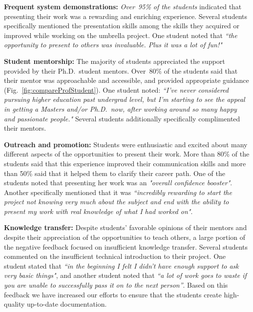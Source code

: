 \documentclass[journal,twopages]{IEEEtran}
\newcommand{\makered}[1]{\color{black}#1\color{black}}
\newenvironment{myitemize}{\begin{list}{}{\renewcommand{\leftmargin}{0.2in}}}{\end{list}}
\begin{document}
\begin{myitemize}
\item  \textbf{Frequent system demonstrations:}
    \emph{Over~95\% of the students} indicated that presenting their work was a rewarding and enriching experience. Several students specifically mentioned the presentation skills among the skills they acquired or improved while working on the umbrella project.
    One student noted that
    \emph{``the opportunity to present to
    others was invaluable. Plus it was a lot of fun!"}

\item  \textbf{Student mentorship:} The majority of students appreciated the
    support provided by their Ph.D.\ student mentors.
    Over~80\% of the students said that their mentor was approachable and accessible, and provided appropriate guidance (Fig.~\ref{fig:compareProfStudent}).
    One student noted: \emph{``I've never considered pursuing higher education past undergrad level, but I'm starting to see the appeal in getting a Masters and/or Ph.D.\ now, after working around so many happy and passionate people."} Several students additionally specifically complimented their mentors.



\item  \textbf{Outreach and promotion:}
    \makered{Students were enthusiastic and excited about many different aspects of the
    opportunities to present their work. More than 80\% of the students said that this experience improved their communication skills and more than 50\% said that it helped them to clarify their career path. One of the students noted that presenting her work was an \emph{"overall confidence booster"}. Another specifically mentioned that it was \emph{``incredibly rewarding to start the project not knowing very much about the subject and end with the ability to present my work with real knowledge of what I had worked on"}}.

\item  \textbf{Knowledge transfer:} Despite students' favorable opinions of their mentors and despite their appreciation of the opportunities to teach others, a large portion of the negative feedback focused on insufficient knowledge transfer. Several students commented on the insufficient technical introduction to their project. One student stated that \emph{``in the beginning I felt I didn't have enough support to ask very basic things"}, and another student noted that \emph{``a lot of work goes to waste if you are unable to successfully pass it on to the next person''}. Based on this feedback we have increased our efforts to ensure that the students create high-quality up-to-date documentation.
\end{myitemize}
\end{document}
